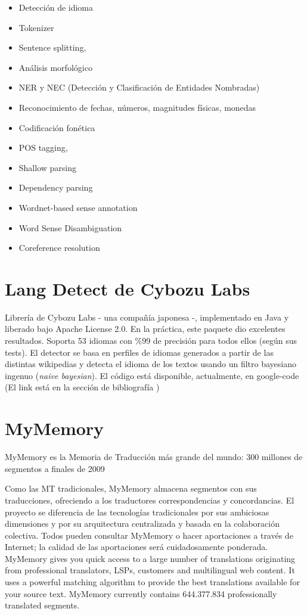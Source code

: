 \begin{itemize}
\item Detecci\'on de idioma
\item Tokenizer
\item Sentence splitting,
\item Análisis morfol\'ogico
\item NER y NEC (Detecci\'on y Clasificaci\'on de Entidades Nombradas)
\item Reconocimiento de fechas, números, magnitudes físicas, monedas
\item Codificaci\'on fonética
\item POS tagging, 
\item Shallow parsing
\item Dependency parsing
\item Wordnet-based sense annotation
\item Word Sense Disambiguation
\item Coreference resolution
\end{itemize}



\section{Lang Detect de Cybozu Labs}
\label{sec:cybozu}

Librería de Cybozu Labs - una compañía japonesa -, implementado en Java y liberado bajo Apache License 2.0. En la práctica, este paquete dio excelentes resultados. Soporta 53 idiomas con \%99 de precisión para todos ellos (según sus tests). El detector se basa en perfiles de idiomas generados a partir de las distintas wikipedias y detecta el idioma de los textos usando un filtro bayesiano ingenuo (\textit{naive bayesian}).
El código está disponible, actualmente, en google-code (El link está en la sección de bibliografía \cite{nakatani2010langdetect})

\section{MyMemory}
MyMemory es la Memoria de Traducción más grande del mundo: 300 millones de segmentos a finales de 2009

Como las MT tradicionales, MyMemory almacena segmentos con sus traducciones, ofreciendo a los traductores correspondencias y concordancias. El proyecto se diferencia de las tecnologías tradicionales por sus ambiciosas dimensiones y por su arquitectura centralizada y basada en la colaboración colectiva. Todos pueden consultar MyMemory o hacer aportaciones a través de Internet; la calidad de las aportaciones será cuidadosamente ponderada.
MyMemory gives you quick access to a large number of translations originating from professional translators, LSPs, customers and multilingual web content. It uses a powerful matching algorithm to provide the best translations available for your source text. MyMemory currently contains 644.377.834 professionally translated segments.

